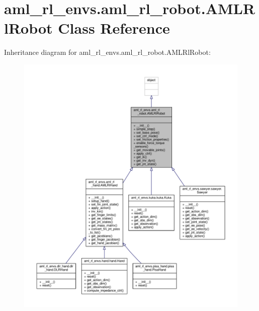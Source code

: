 \hypertarget{classaml__rl__envs_1_1aml__rl__robot_1_1_a_m_l_rl_robot}{\section{aml\-\_\-rl\-\_\-envs.\-aml\-\_\-rl\-\_\-robot.\-A\-M\-L\-Rl\-Robot Class Reference}
\label{classaml__rl__envs_1_1aml__rl__robot_1_1_a_m_l_rl_robot}
}


Inheritance diagram for aml\-\_\-rl\-\_\-envs.\-aml\-\_\-rl\-\_\-robot.\-A\-M\-L\-Rl\-Robot\-:
\nopagebreak
\begin{figure}[H]
\begin{center}
\leavevmode
\includegraphics[width=350pt]{classaml__rl__envs_1_1aml__rl__robot_1_1_a_m_l_rl_robot__inherit__graph}
\end{center}
\end{figure}



